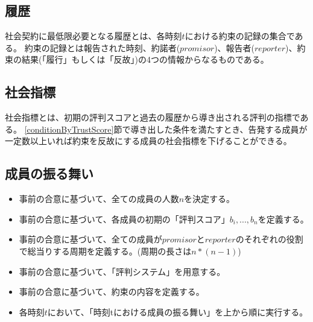 \subsection{履歴}
社会契約に最低限必要となる履歴とは、各時刻$t$における約束の記録の集合である。
約束の記録とは報告された時刻、約諾者($promisor$)、報告者($reporter$)、約束の結果(「履行」もしくは「反故」)の4つの情報からなるものである。

\subsection{社会指標}
社会指標とは、初期の評判スコアと過去の履歴から導き出される評判の指標である。
\ref{conditionByTrustScore}節で導き出した条件を満たすとき、告発する成員が一定数以上いれば約束を反故にする成員の社会指標を下げることができる。

\subsection{成員の振る舞い}
  \begin{itemize}
    \item 事前の合意に基づいて、全ての成員の人数$n$を決定する。
    \item 事前の合意に基づいて、各成員の初期の「評判スコア」$b_i, ..., b_n$を定義する。
    \item 事前の合意に基づいて、全ての成員が$promisor$と$reporter$のそれぞれの役割で総当りする周期を定義する。(周期の長さは$ n * (n-1)$)
    \item 事前の合意に基づいて、「評判システム」を用意する。
    \item 事前の合意に基づいて、約束の内容を定義する。
    \item 各時刻$t$において、「時刻tにおける成員の振る舞い」を上から順に実行する。
  \end{itemize}

